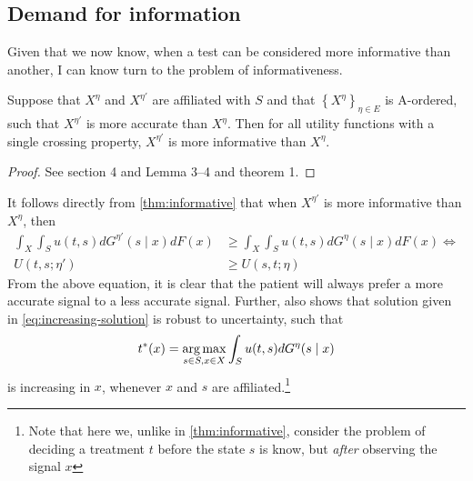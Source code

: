 \documentclass[10pt,a4paper]{article} 					%
\begin{document}

\subsection{Demand for information}

Given that we now know, when a test can be considered more informative than another, I can know turn to the problem of informativeness.

\begin{thm}\label{thm:informative}
\parencite{Persico2000}
Suppose that $X^{\eta}$ and $X^{\eta'}$ are affiliated with $S$ and that $\left \{X^{\eta}\right \} _{\eta\in E}$ is A-ordered, such that $X^{\eta'}$ is more accurate than $X^{\eta}$. Then for all utility functions with a single crossing property, $X^{\eta'}$ is more informative than $X^{\eta}$.
\end{thm}
\begin{proof}
See \citet{Lehmann1988} section 4 and \citet{Karlin1956a} Lemma 3--4 and theorem 1.
\end{proof}

It follows directly from \cref{thm:informative} that when $X^{\eta'}$ is more informative than $X^{\eta}$, then
\begin{align*}
	\int_{X}\int_{S}u(t,s)dG^{\eta'}(s\mid x)dF(x)&\geq \int_{X}\int_{S}u(t,s)dG^{\eta}(s\mid x)dF(x) \Leftrightarrow \\
	U(t,s;\eta')&\geq U(s,t;\eta)
\end{align*}
From the above equation, it is clear that the patient will always prefer a more accurate signal to a less accurate signal. Further, \textcite{Athey2002} also shows that solution given in \cref{eq:increasing-solution} is robust to uncertainty, such that
\[
	t^*(x)=\argmax_{s\in S, x\in X}\int_Su(t,s)d G^\eta(s\mid x)
\]
is increasing in $x$, whenever $x$ and $s$ are affiliated.\footnote{Note that here we, unlike in \cref{thm:informative}, consider the problem of deciding a treatment $t$ before the state $s$ is know, but \emph{after} observing the signal $x$}

\end{document}
